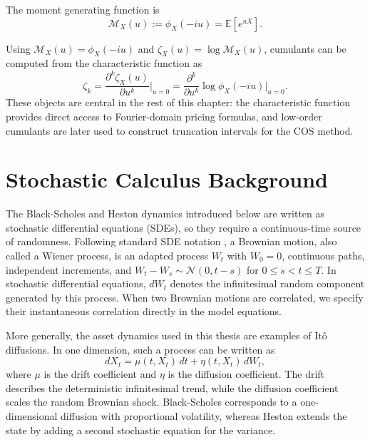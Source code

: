 The moment generating function is
\begin{equation}
    \mathcal M_X(u):= \phi_X(-iu) = \mathbb E\left[ e^{uX} \right]. 
\end{equation}


Using $\mathcal M_X(u)=\phi_X(-iu)$ and $\zeta_X(u)=\log \mathcal M_X(u)$, cumulants can be computed from the characteristic function as
\begin{equation}
    \label{eq:cumulants}
    \zeta_k =\frac{\partial ^k \zeta_X(u)}{\partial u^k}\bigg|_{u=0}=\frac{\partial ^k}{\partial u^k}\log \phi_X(-iu)\bigg|_{u=0}.
\end{equation}
These objects are central in the rest of this chapter: the characteristic function provides direct access to Fourier-domain pricing formulas, and low-order cumulants are later used to construct truncation intervals for the COS method.

\section{Stochastic Calculus Background}
\label{sec:stochastic_calculus_background}
The Black-Scholes and Heston dynamics introduced below are written as stochastic differential equations (SDEs), so they require a continuous-time source of randomness. Following standard SDE notation \cite[Chs.~2--4]{oksendal2003}, a Brownian motion, also called a Wiener process, is an adapted process $W_t$ with $W_0=0$, continuous paths, independent increments, and $W_t-W_s\sim\mathcal N(0,t-s)$ for $0\leq s<t\leq T$. In stochastic differential equations, $dW_t$ denotes the infinitesimal random component generated by this process. When two Brownian motions are correlated, we specify their instantaneous correlation directly in the model equations.

More generally, the asset dynamics used in this thesis are examples of It\^o diffusions. In one dimension, such a process can be written as
\begin{equation}
    \label{eq:ito_diffusion}
    dX_t=\mu(t,X_t)\,dt+\eta(t,X_t)\,dW_t,
\end{equation}
where $\mu$ is the drift coefficient and $\eta$ is the diffusion coefficient. The drift describes the deterministic infinitesimal trend, while the diffusion coefficient scales the random Brownian shock. Black-Scholes corresponds to a one-dimensional diffusion with proportional volatility, whereas Heston extends the state by adding a second stochastic equation for the variance.

